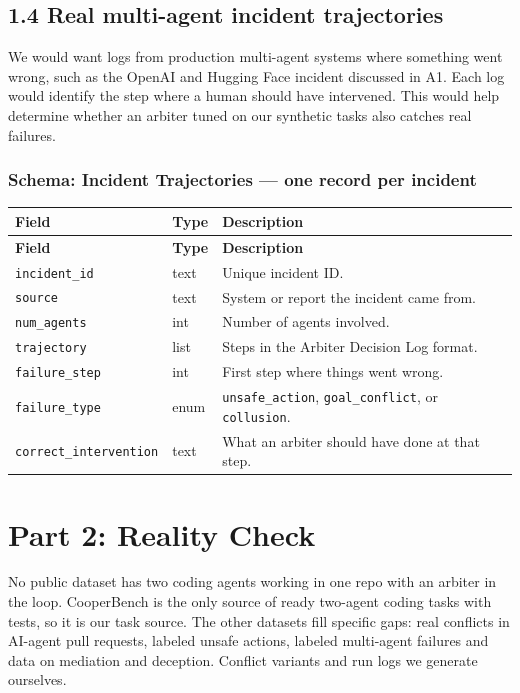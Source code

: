 \documentclass[11pt]{article}
\newcommand{\code}[1]{\texttt{#1}}
\begin{document}
\subsection*{1.4 Real multi-agent incident trajectories}

We would want logs from production multi-agent systems where something went wrong, such as the OpenAI and Hugging Face incident discussed in A1. Each log would identify the step where a human should have intervened. This would help determine whether an arbiter tuned on our synthetic tasks also catches real failures.

\subsubsection*{Schema: Incident Trajectories --- one record per incident}

{\small
\begin{longtable}{@{}L{4.8cm}L{1.6cm}L{\dimexpr\linewidth-6.4cm-4\tabcolsep\relax}@{}}
\toprule
\textbf{Field} & \textbf{Type} & \textbf{Description} \\
\midrule
\endfirsthead
\toprule
\textbf{Field} & \textbf{Type} & \textbf{Description} \\
\midrule
\endhead
\bottomrule
\endlastfoot
\code{incident\_id} & text & Unique incident ID. \\
\code{source} & text & System or report the incident came from. \\
\code{num\_agents} & int & Number of agents involved. \\
\code{trajectory} & list & Steps in the Arbiter Decision Log format. \\
\code{failure\_step} & int & First step where things went wrong. \\
\code{failure\_type} & enum & \code{unsafe\_action}, \code{goal\_conflict}, or \code{collusion}. \\
\code{correct\_intervention} & text & What an arbiter should have done at that step. \\
\end{longtable}
}

\clearpage

\section*{Part 2: Reality Check}

No public dataset has two coding agents working in one repo with an arbiter in the loop. CooperBench is the only source of ready two-agent coding tasks with tests, so it is our task source. The other datasets fill specific gaps: real conflicts in AI-agent pull requests, labeled unsafe actions, labeled multi-agent failures and data on mediation and deception. Conflict variants and run logs we generate ourselves.
\end{document}
